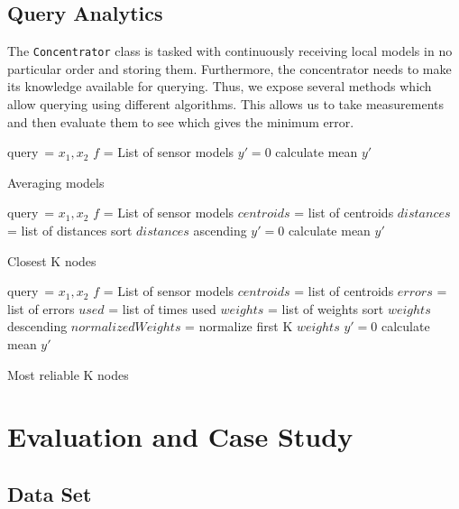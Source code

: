 \documentclass{mproj}
\begin{document}
\section{Query Analytics}
The \texttt{Concentrator} class is tasked with continuously receiving local models in no particular order and storing them. Furthermore, the concentrator needs to make its knowledge available for querying. Thus, we expose several methods which allow querying using different algorithms. This allows us to take measurements and then evaluate them to see which gives the minimum error.

\begin{algorithm}[H]
 query\ = $x_1,x_2$\; 
 $f$ = List of sensor models\;
 $y'=0$\;
 calculate mean $y'$
 \caption{Averaging models}
 \label{alg:avgModels}
\end{algorithm}

\begin{algorithm}[H]
 query\ = $x_1,x_2$\;
 $f$ = List of sensor models\;
 $centroids$ = list of centroids\;
 $distances$ = list of distances\;
 sort $distances$ ascending\;
 $y'=0$\;
 calculate mean $y'$\;
 \caption{Closest K nodes}
 \label{alg:closestModels}
\end{algorithm}

\begin{algorithm}[H]
 query\ = $x_1,x_2$\;
 $f$ = List of sensor models\;
 $centroids$ = list of centroids\;
 $errors$ = list of errors\;
 $used$ = list of times used\;
 $weights$ = list of weights\;
 sort $weights$ descending\;
 $normalizedWeights$ = normalize first K $weights$\;
 $y'=0$\;
 calculate mean $y'$\;
 \caption{Most reliable K nodes}
 \label{alg:reliableModels}
\end{algorithm}

\chapter{Evaluation and Case Study}

\section{Data Set}
\end{document}
